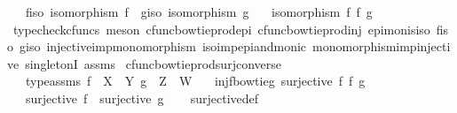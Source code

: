 \begin{isabellebody}
\ \ \ f{\isacharunderscore}{\kern0pt}iso{\isacharcolon}{\kern0pt}\ {\isachardoublequoteopen}isomorphism\ f{\isachardoublequoteclose}\ \ g{\isacharunderscore}{\kern0pt}iso{\isacharcolon}{\kern0pt}\ {\isachardoublequoteopen}isomorphism\ g{\isachardoublequoteclose}\isanewline
\ \ \ {\isachardoublequoteopen}isomorphism\ {\isacharparenleft}{\kern0pt}f\ {\isasymbowtie}\isactrlsub f\ g{\isacharparenright}{\kern0pt}{\isachardoublequoteclose}\isanewline
%
\isadelimproof
\ \ %
\endisadelimproof
%
\isatagproof
{}\isamarkupfalse%
\ {\isacharparenleft}{\kern0pt}typecheck{\isacharunderscore}{\kern0pt}cfuncs{\isacharcomma}{\kern0pt}\ meson\ cfunc{\isacharunderscore}{\kern0pt}bowtieprod{\isacharunderscore}{\kern0pt}epi\ cfunc{\isacharunderscore}{\kern0pt}bowtieprod{\isacharunderscore}{\kern0pt}inj\ epi{\isacharunderscore}{\kern0pt}mon{\isacharunderscore}{\kern0pt}is{\isacharunderscore}{\kern0pt}iso\ f{\isacharunderscore}{\kern0pt}iso\ g{\isacharunderscore}{\kern0pt}iso\ injective{\isacharunderscore}{\kern0pt}imp{\isacharunderscore}{\kern0pt}monomorphism\ iso{\isacharunderscore}{\kern0pt}imp{\isacharunderscore}{\kern0pt}epi{\isacharunderscore}{\kern0pt}and{\isacharunderscore}{\kern0pt}monic\ monomorphism{\isacharunderscore}{\kern0pt}imp{\isacharunderscore}{\kern0pt}injective\ singletonI\ assms{\isacharparenright}{\kern0pt}%
\endisatagproof
{\isafoldproof}%
%
\isadelimproof
\isanewline
%
\endisadelimproof
\isanewline
{}\isamarkupfalse%
\ cfunc{\isacharunderscore}{\kern0pt}bowtieprod{\isacharunderscore}{\kern0pt}surj{\isacharunderscore}{\kern0pt}converse{\isacharcolon}{\kern0pt}\isanewline
\ \ \ type{\isacharunderscore}{\kern0pt}assms{\isacharcolon}{\kern0pt}\ {\isachardoublequoteopen}f\ {\isacharcolon}{\kern0pt}\ X\ {\isasymrightarrow}\ Y{\isachardoublequoteclose}\ {\isachardoublequoteopen}g\ {\isacharcolon}{\kern0pt}\ Z\ {\isasymrightarrow}\ W{\isachardoublequoteclose}\isanewline
\ \ \ inj{\isacharunderscore}{\kern0pt}f{\isacharunderscore}{\kern0pt}bowtie{\isacharunderscore}{\kern0pt}g{\isacharcolon}{\kern0pt}\ {\isachardoublequoteopen}surjective\ {\isacharparenleft}{\kern0pt}f\ {\isasymbowtie}\isactrlsub f\ g{\isacharparenright}{\kern0pt}{\isachardoublequoteclose}\isanewline
\ \ \ {\isachardoublequoteopen}surjective\ f\ {\isasymand}\ surjective\ g{\isachardoublequoteclose}\isanewline
%
\isadelimproof
\ \ %
\endisadelimproof
%
\isatagproof
{}\isamarkupfalse%
\ surjective{\isacharunderscore}{\kern0pt}def\isanewline

\end{isabellebody}
